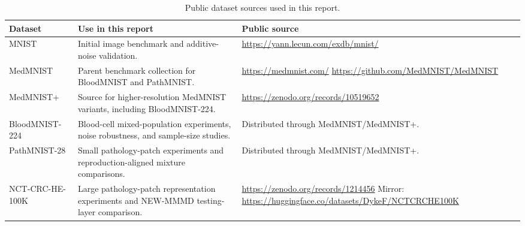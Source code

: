 \documentclass[12pt]{article}
\begin{document}
\begin{table}[H]
\centering
\caption{Public dataset sources used in this report.}
\label{tab:data-availability}
\scriptsize
\setlength{\tabcolsep}{4pt}
\begin{tabular}{p{}p{}p{}}
\toprule
Dataset & Use in this report & Public source \\
\midrule
MNIST
& Initial image benchmark and additive-noise validation.
& \url{https://yann.lecun.com/exdb/mnist/} \\
\addlinespace
MedMNIST
& Parent benchmark collection for BloodMNIST and PathMNIST.
& \url{https://medmnist.com/} \newline
  \url{https://github.com/MedMNIST/MedMNIST} \\
\addlinespace
MedMNIST+
& Source for higher-resolution MedMNIST variants, including BloodMNIST-224.
& \url{https://zenodo.org/records/10519652} \\
\addlinespace
BloodMNIST-224
& Blood-cell mixed-population experiments, noise robustness, and sample-size studies.
& Distributed through MedMNIST/MedMNIST+. \\
\addlinespace
PathMNIST-28
& Small pathology-patch experiments and reproduction-aligned mixture comparisons.
& Distributed through MedMNIST/MedMNIST+. \\
\addlinespace
NCT-CRC-HE-100K
& Large pathology-patch representation experiments and NEW-MMMD testing-layer comparison.
& \url{https://zenodo.org/records/1214456} \newline
  Mirror: \url{https://huggingface.co/datasets/DykeF/NCTCRCHE100K} \\
\bottomrule
\end{tabular}
\end{table}
\end{document}
